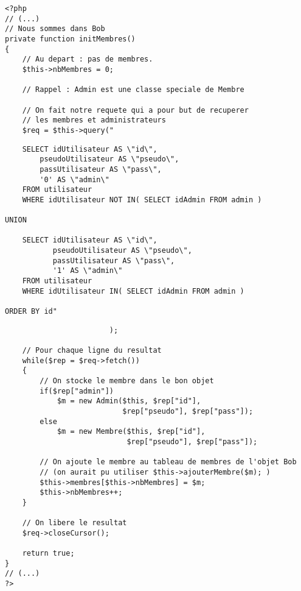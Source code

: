 \lstset{language=PHP}
\begin{lstlisting}
<?php
// (...)
// Nous sommes dans Bob
private function initMembres()
{
    // Au depart : pas de membres.
    $this->nbMembres = 0;
    
    // Rappel : Admin est une classe speciale de Membre

    // On fait notre requete qui a pour but de recuperer 
    // les membres et administrateurs
    $req = $this->query("  
\end{lstlisting}
\lstset{language=SQL}
\begin{lstlisting}
    SELECT idUtilisateur AS \"id\",
        pseudoUtilisateur AS \"pseudo\",
        passUtilisateur AS \"pass\",
        '0' AS \"admin\"
    FROM utilisateur
    WHERE idUtilisateur NOT IN( SELECT idAdmin FROM admin )
                            
UNION
                            
    SELECT idUtilisateur AS \"id\",
           pseudoUtilisateur AS \"pseudo\",
           passUtilisateur AS \"pass\",
           '1' AS \"admin\"
    FROM utilisateur
    WHERE idUtilisateur IN( SELECT idAdmin FROM admin )
                            
ORDER BY id"
\end{lstlisting}
\lstset{language=PHP}
\begin{lstlisting}
                        );            

    // Pour chaque ligne du resultat
    while($rep = $req->fetch())
    {
        // On stocke le membre dans le bon objet
        if($rep["admin"])
            $m = new Admin($this, $rep["id"], 
                           $rep["pseudo"], $rep["pass"]);
        else
            $m = new Membre($this, $rep["id"], 
                            $rep["pseudo"], $rep["pass"]);
            
        // On ajoute le membre au tableau de membres de l'objet Bob
        // (on aurait pu utiliser $this->ajouterMembre($m); )
        $this->membres[$this->nbMembres] = $m;            
        $this->nbMembres++;
    }

    // On libere le resultat
    $req->closeCursor();
    
    return true;
}
// (...)
?>
\end{lstlisting}